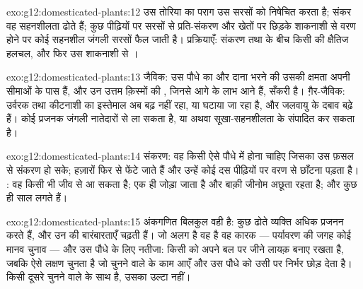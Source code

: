 \begin{solution}{exo:g12:domesticated-plants:12}
उस तोरिया का पराग उस सरसों को निषेचित करता है; संकर वह सहनशीलता  ढोते
हैं; कुछ पीढ़ियों पर सरसों से प्रति-संकरण और खेतों पर छिड़के शाकनाशी से
वरण होने पर कोई सहनशील जंगली सरसों फैल जाती है। प्रक्रियाएँ: संकरण तथा
 के बीच किसी  की क्षैतिज हलचल, और फिर उस शाकनाशी से ।
\end{solution}

\begin{solution}{exo:g12:domesticated-plants:13}
जैविक: उस पौधे का  और दाना भरने की उसकी क्षमता अपनी सीमाओं के
पास हैं, और उन उत्तम क़िस्मों की , जिनसे आगे के लाभ आने
हैं, सँकरी है। ग़ैर-जैविक: उर्वरक तथा कीटनाशी का इस्तेमाल अब बढ़ नहीं रहा,
या घटाया जा रहा है, और जलवायु के दबाव बढ़े हैं। कोई प्रजनक जंगली नातेदारों
से  ला सकता है, या  अथवा सूखा-सहनशीलता के 
संपादित कर सकता है।
\end{solution}

\begin{solution}{exo:g12:domesticated-plants:14}
संकरण: वह  किसी ऐसे पौधे में होना चाहिए जिसका उस फ़सल से संकरण
हो सके; हज़ारों  फिर से फेंटे जाते हैं और उन्हें कोई दस पीढ़ियों पर वरण
से छाँटना पड़ता है। : वह  किसी भी जीव से आ सकता है; एक ही 
जोड़ा जाता है और बाक़ी जीनोम अछूता रहता है; और कुछ ही साल लगते हैं।
\end{solution}

\begin{solution}{exo:g12:domesticated-plants:15}
अंकगणित बिलकुल वही है: कुछ  ढोते व्यक्ति अधिक प्रजनन करते हैं,
और उन  की बारंबारताएँ चढ़ती हैं। जो अलग है वह है वह कारक ---
पर्यावरण की जगह कोई मानव चुनाव --- और उस पौधे के लिए नतीजा: 
किसी  को अपने बल पर जीने लायक़ बनाए रखता है, जबकि  ऐसे लक्षण
चुनता है जो चुनने वाले के काम आएँ और उस पौधे को उसी पर निर्भर छोड़ देता है।
 किसी दूसरे चुनने वाले के साथ  है, उसका उल्टा नहीं।
\end{solution}

